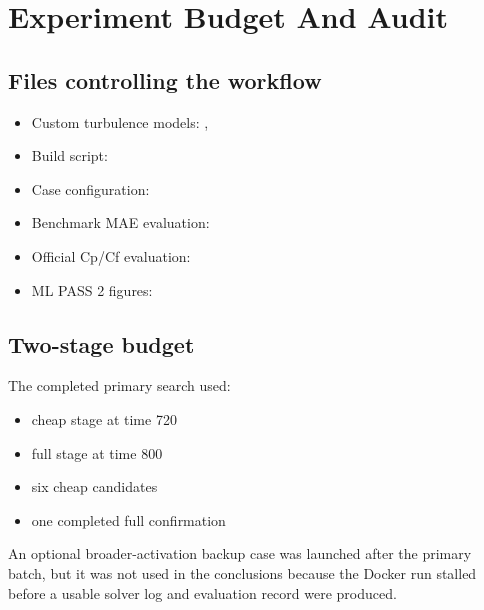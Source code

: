 \documentclass[11pt]{article}
\begin{document}
\section{Experiment Budget And Audit}
\subsection*{Files controlling the workflow}
\begin{itemize}[leftmargin=1.2em]
\item Custom turbulence models:
  ,
\item Build script:
\item Case configuration:
\item Benchmark MAE evaluation:
\item Official Cp/Cf evaluation:
\item ML PASS 2 figures:
\end{itemize}

\subsection*{Two-stage budget}
The completed primary search used:
\begin{itemize}[leftmargin=1.2em]
\item cheap stage at time \num{720}
\item full stage at time \num{800}
\item six cheap candidates
\item one completed full confirmation
\end{itemize}

An optional broader-activation backup case was launched after the primary batch,
but it was not used in the conclusions because the Docker run stalled before a
usable solver log and evaluation record were produced.
\end{document}
